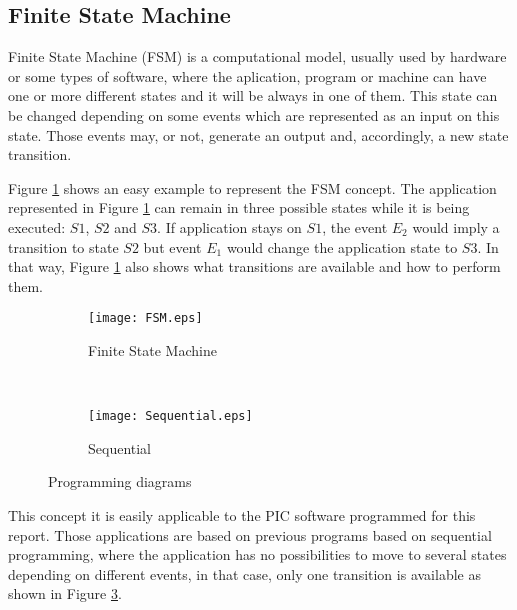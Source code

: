 \subsection{Finite State Machine}\label{S:Res:Code:FSM}
Finite State Machine (FSM) is a computational model, usually used by hardware or some types of software, where the aplication, program or machine can have one or more different states and it will be always in one of them. This state can be changed depending on some events which are represented as an input on this state. Those events may, or not, generate an output and, accordingly, a new state transition.
\medskip

Figure \ref{fig:FSM} shows an easy example to represent the FSM concept. The application represented in Figure \ref{fig:FSM} can remain in three possible states while it is being executed: $S1$, $S2$ and $S3$. If application stays on $S1$, the event $E_{2}$ would imply a transition to state $S2$ but event $E_{1}$ would change the application state to $S3$. In that way, Figure \ref{fig:FSM} also shows what transitions are available and how to perform them.

\begin{figure}[h]
\centering
	\begin{subfigure}[b]{0.50\textwidth}
	\texttt{[image: FSM.eps]}
	\caption{Finite State Machine}
	\label{fig:FSM}
	\end{subfigure}
	~
	\begin{subfigure}[b]{0.30\textwidth}
	\texttt{[image: Sequential.eps]}
	\caption{Sequential}
	\label{fig:Sequential}
	\end{subfigure}
\caption{Programming diagrams}
\end{figure}

This concept it is easily applicable to the PIC software programmed for this report. Those applications are based on previous programs based on sequential programming, where the application has no possibilities to move to several states depending on different events, in that case, only one transition is available as shown in Figure \ref{fig:Sequential}.